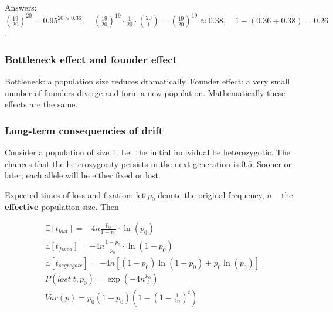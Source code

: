 \documentclass[main.tex]{subfiles}
\begin{document}
Answers: $ \left( \frac{19}{20} \right)^{20} = 0.95^{20 \approx 0.36}, \quad \left( \frac{19}{20} \right)^{19} \cdot \frac{1}{20} \cdot \binom{20}{1} = \left( \frac{19}{20} \right)^{19} \approx 0.38, \quad 1 - (0.36+0.38) = 0.26 $.

\subsubsection{Bottleneck effect and founder effect}

Bottleneck: a population size reduces dramatically.
Founder effect: a very small number of founders diverge and form a new population.
Mathematically these effects are the same.

\subsubsection{Long-term consequencies of drift}

Consider a population of size 1.
Let the initial individual be heterozygotic.
The chances that the heterozygocity persists in the next generation is $0.5$.
Sooner or later, each allele will be either fixed or lost.

Expected times of loss and fixation: let $ p_0 $ denote the original frequency, $ n $ -- the \textbf{effective} population size.
Then

\begin{gather*}
	\mathds E [t_{lost}] = -4 n \frac{p_0}{1-p_0} \cdot \ln(p_0) \\
	\mathds E [t_{fixed}] = -4n \frac{1-p_0}{p_0} \cdot \ln(1-p_0) \\
	\mathds E[t_{segregate}] = -4n [(1-p_0) \ln (1-p_0) + p_0 \ln (p_0)] \\
	P(lost | t, p_0) = \exp \left( -4n \frac{p_0}{t} \right) \\
	Var(p) = p_0 (1-p_0) \left( 1 - \left( 1 - \frac{1}{2n} \right)^t \right)
\end{gather*}
\end{document}
